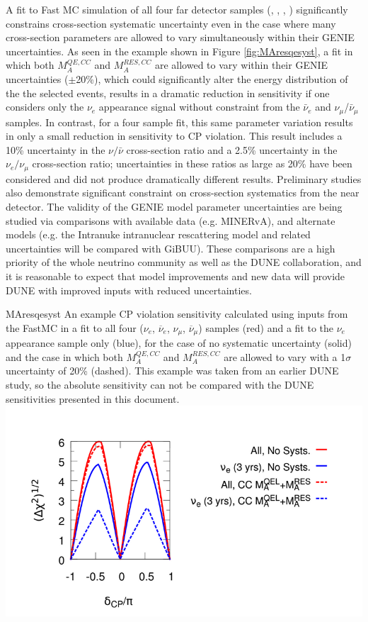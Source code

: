 A fit to Fast MC simulation of all four far detector samples
(\nue, \anue, \numu, \anumu) significantly
constrains cross-section systematic uncertainty even in the case where many
cross-section parameters are allowed to vary simultaneously within their
GENIE uncertainties. As seen in the example shown in Figure
\ref{fig:MAresqesyst}, 
a fit in which both $M_A^{QE,CC}$ and 
$M_A^{RES,CC}$ are allowed to vary within their GENIE uncertainties 
($\pm$20\%), which could significantly alter the energy distribution of the 
the selected events, results in a dramatic reduction in sensitivity if one 
considers only the $\nu_e$ appearance signal without constraint from the 
$\bar{\nu}_e$ and $\nu_{\mu}$/$\bar{\nu}_{\mu}$ samples.
In contrast, for a four sample fit,
this same parameter variation results in only a small reduction in
sensitivity to CP violation.
This result includes a 10\% uncertainty in the $\nu/\bar{\nu}$
cross-section ratio and a 2.5\% uncertainty in the $\nu_e/\nu_{\mu}$
cross-section ratio; uncertainties in these ratios as large as 20\% have
been considered and did not produce dramatically different results.
Preliminary studies also
demonstrate significant constraint on cross-section systematics from the 
near detector. The validity of the GENIE model parameter uncertainties are being
studied via comparisons with available data (e.g. MINERvA), and alternate models
(e.g. the Intranuke intranuclear rescattering model and related uncertainties will be
compared with GiBUU). These comparisons are a high priority of the whole neutrino
community as well as the DUNE collaboration, and it is reasonable to expect that
model improvements and new data will provide DUNE with improved inputs with reduced
uncertainties.
%
\begin{cdrfigure}{MAresqesyst}{
An example CP violation sensitivity calculated using inputs from the 
  FastMC in a fit to all four ($\nu_e$, $\overline\nu_e$, $\nu_{\mu}$, 
  $\overline\nu_{\mu}$) samples (red) and a fit to the $\nu_e$ appearance sample 
  only (blue), for the case of no systematic uncertainty (solid) and the case in
  which both $M_A^{QE,CC}$ and $M_A^{RES,CC}$ are allowed to vary with a
  1$\sigma$ uncertainty of 20\% (dashed). This example was taken from an earlier
  DUNE study, so the absolute sensitivity can not be compared with the DUNE 
  sensitivities presented in this document.}
\includegraphics[width=0.8\linewidth]{volume-physics/figures/CPV_MARESQE.png}
\end{cdrfigure}

